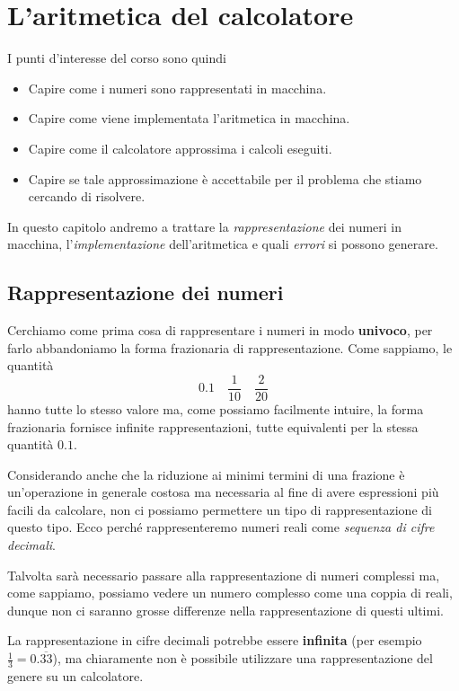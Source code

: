 \chapter{L'aritmetica del calcolatore}

I punti d'interesse del corso sono quindi

\begin{itemize}
	\item Capire come i numeri sono rappresentati in macchina.
	\item Capire come viene implementata l'aritmetica in macchina.
	\item Capire come il calcolatore approssima i calcoli eseguiti.
	\item Capire se tale approssimazione è accettabile per il problema che stiamo cercando di risolvere.
\end{itemize}

In questo capitolo andremo a trattare la \emph{rappresentazione} dei numeri in macchina, l'\emph{implementazione}
dell'aritmetica e quali \emph{errori} si possono generare.

\section{Rappresentazione dei numeri}

Cerchiamo come prima cosa di rappresentare i numeri in modo \textbf{univoco}, per farlo abbandoniamo la forma
frazionaria di rappresentazione. Come sappiamo, le quantità
\[ 0.1 \quad \frac{1}{10} \quad \frac{2}{20} \]
hanno tutte lo stesso valore ma, come possiamo facilmente intuire, la forma frazionaria fornisce infinite
rappresentazioni, tutte equivalenti per la stessa quantità $0.1$.

Considerando anche che la riduzione ai minimi termini di una frazione è un'operazione in generale costosa ma
necessaria al fine di avere espressioni più facili da calcolare, non ci possiamo permettere un tipo di
rappresentazione di questo tipo. Ecco perché rappresenteremo numeri reali come \emph{sequenza di cifre decimali}.

\begin{observation}
	Talvolta sarà necessario passare alla rappresentazione di numeri complessi ma, come sappiamo, possiamo vedere
	un numero complesso come una coppia di reali, dunque non ci saranno grosse differenze nella rappresentazione
	di questi ultimi.
\end{observation}

\begin{observation}
	La rappresentazione in cifre decimali potrebbe essere \textbf{infinita} (per esempio
	$\frac{1}{3} = 0.\overline{33}$), ma chiaramente non è possibile utilizzare una rappresentazione del genere
	su un calcolatore.
\end{observation}

